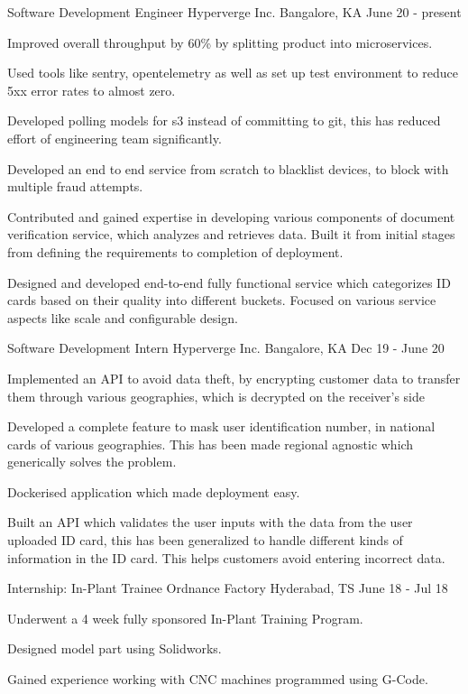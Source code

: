 \begin{cventries}
  \cventry
  {Software Development Engineer}
  {Hyperverge Inc.}
  {Bangalore, KA}
  {June 20 - present}
  {
    \begin{cvitems}
      \item {Improved overall throughput by 60\% by splitting product into microservices.}
      \item {Used tools like sentry, opentelemetry as well as set up test environment to reduce 5xx error rates to almost zero.}
      \item {Developed polling models for s3 instead of committing to git, this has reduced effort of engineering team significantly.}
      \item {Developed an end to end service from scratch to blacklist devices, to block with multiple fraud attempts.}
      \item {Contributed and gained expertise in developing various components of document verification service, which analyzes and retrieves data. Built it from initial stages from defining the requirements to completion of deployment.}
      \item {Designed and developed end-to-end fully functional service which categorizes ID cards based on their quality into different buckets. Focused on various service aspects like scale and configurable design.}
    \end{cvitems}
  }
  \cventry
    {Software Development Intern}
    {Hyperverge Inc.}
    {Bangalore, KA}
    {Dec 19 - June 20}
    {
      \begin{cvitems}
        \item {Implemented an API to avoid data theft, by encrypting customer data to transfer them through various geographies, which is decrypted on the receiver's side}
        \item {Developed a complete feature to mask user identification number, in national cards of various geographies. This has been made regional agnostic which generically solves the problem.}
        \item {Dockerised application which made deployment easy.}
        \item {Built an API which validates the user inputs with the data from the user uploaded ID card, this has been generalized to handle different kinds of information in the ID card. This helps customers avoid entering incorrect data.}
      \end{cvitems}
    }
  \cventry
    {Internship: In-Plant Trainee}
    {Ordnance Factory}
    {Hyderabad, TS}
    {June 18 - Jul 18}
    {
      \begin{cvitems}
        \item {Underwent a 4 week fully sponsored In-Plant Training Program.}
        \item {Designed model part using Solidworks.}
        \item {Gained experience working with CNC machines programmed using G-Code.}
      \end{cvitems}
    }

\end{cventries}
